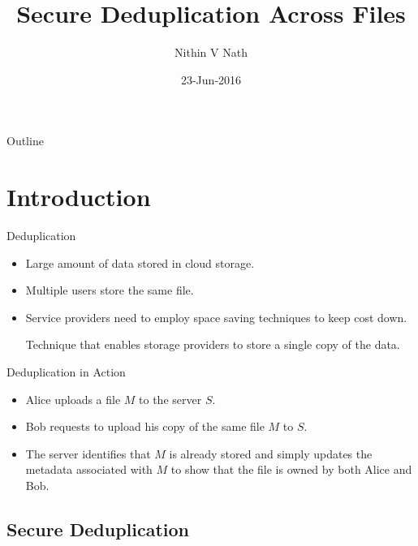 \documentclass{beamer}
\title{Secure Deduplication Across Files}
\author{Nithin V Nath }
\institute[] %
{
	Advisor: Dr. Bhavana Kanukurthi\\\vspace*{2mm}
	Department of Computer Science and Automation\\
	Indian Institute of Science
}
\date{23-Jun-2016}
\begin{document}
\begin{frame}
  \titlepage
\end{frame}

\begin{frame}{Outline}
  \tableofcontents
\end{frame}

\section{Introduction}

\begin{frame}{Deduplication}{}
  \begin{itemize}
  \setlength\itemsep{1em}
  \item {
    Large amount of data stored in cloud storage.
  }
  \item {
    Multiple users store the same file.
  }
  \item {
    Service providers need to employ space saving techniques to keep cost down.
  }
	\begin{definition}
		Technique that enables storage providers to store a single copy of the data.
	\end{definition}
  \end{itemize}
\end{frame}

\begin{frame}{Deduplication in Action}
  \begin{itemize}
  \setlength\itemsep{1em}
  \item {
    Alice uploads a file $M$ to the server $S$.
  }
  \item {   
	 Bob requests to upload his copy of the same file $M$ to $S$.
  }
  \item{The server identifies
	that $M$ is already stored and simply updates the metadata associated with $M$ to show
	that the file is owned by both Alice and Bob.
  }
  \end{itemize}
\end{frame}

\subsection{Secure Deduplication}
\end{document}
